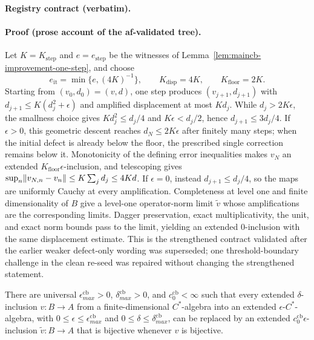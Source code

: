 \noindent\textbf{Registry contract (verbatim).}

\paragraph{Proof (prose account of the af-validated tree).}
Let $K=K_{\mathrm{step}}$ and $e=e_{\mathrm{step}}$ be the witnesses of
Lemma~\ref{lem:maincb-improvement-one-step}, and choose
\[
 e_{\mathrm{it}}=\min\{e,(4K)^{-1}\},\qquad
 K_{\mathrm{disp}}=4K,\qquad K_{\mathrm{floor}}=2K.
\]
Starting from $(v_0,d_0)=(v,d)$, one step produces $(v_{j+1},d_{j+1})$ with
$d_{j+1}\le K(d_j^2+\epsilon)$ and amplified displacement at most $Kd_j$.
While $d_j>2K\epsilon$, the smallness choice gives
$Kd_j^2\le d_j/4$ and $K\epsilon<d_j/2$, hence
$d_{j+1}\le3d_j/4$.  If $\epsilon>0$, this geometric descent reaches
$d_N\le2K\epsilon$ after finitely many steps; when the initial defect is already
below the floor, the prescribed single correction remains below it.  Monotonicity
of the defining error inequalities makes $v_N$ an extended
$K_{\mathrm{floor}}\epsilon$-inclusion, and telescoping gives
$\sup_n\lVert v_{N,n}-v_n\rVert\le K\sum_jd_j\le4Kd$.
If $\epsilon=0$, instead $d_{j+1}\le d_j/4$, so the maps are uniformly Cauchy
at every amplification.  Completeness at level one and finite dimensionality of
$B$ give a level-one operator-norm limit $\widetilde v$ whose amplifications are
the corresponding limits.  Dagger preservation, exact multiplicativity, the unit,
and exact norm bounds pass to the limit, yielding an extended $0$-inclusion with
the same displacement estimate.  This is the strengthened contract validated after
the earlier weaker defect-only wording was superseded; one threshold-boundary
challenge in the clean re-seed was repaired without changing the strengthened statement.

\begin{lemma}\label{lem:maincb-error-improvement}
There are universal $\epsilon_{max}^{\mathrm{cb}}>0$,
$\delta_{max}^{\mathrm{cb}}>0$, and $c_{0}^{\mathrm{cb}}<\infty$ such that
every extended $\delta$-inclusion $v:B\to A$ from a finite-dimensional
$C^{*}$-algebra into an extended $\epsilon$-$C^{*}$-algebra, with
$0\le\epsilon\le\epsilon_{max}^{\mathrm{cb}}$ and
$0\le\delta\le\delta_{max}^{\mathrm{cb}}$, can be replaced by an extended
$c_{0}^{\mathrm{cb}}\epsilon$-inclusion $\widetilde v:B\to A$ that is
bijective whenever $v$ is bijective.
\end{lemma}

